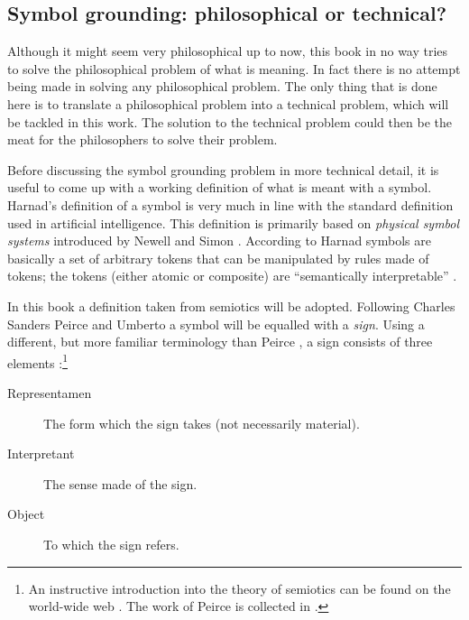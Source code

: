 \subsection{Symbol grounding: philosophical or technical?}

\label{s:intro:semiotic}

Although it might seem very philosophical up to now, this book in no way tries to solve the philosophical problem of what is meaning. In fact there is no attempt being made in solving any philosophical problem. The only thing that is done here is to translate a philosophical problem into a technical problem, which will be tackled in this work. The solution to the technical problem could then be the meat for the philosophers to solve their problem.


Before discussing the symbol grounding problem in more technical detail, it is useful to come up with a working definition of what is meant with a symbol. Harnad's definition of a symbol is very much in line with the standard definition used in artificial intelligence. This definition is primarily based on {\em physical symbol systems} introduced by Newell and Simon \citep{newell:1980,newell:1990}. According to Harnad symbols are basically a set of arbitrary tokens that can be manipulated by rules made of tokens; the tokens (either atomic or composite) are ``semantically interpretable'' \citep{harnad:1990}.


In this book a definition taken from semiotics will be adopted. Following Charles Sanders Peirce and Umberto \citep{eco:1976,eco:1986} a symbol will be equalled with a {\em sign}. Using a different, but more familiar terminology than Peirce  \citep{noth:1990}, a sign consists of three elements \citep{chandler:1994}:\footnote{An instructive introduction into the theory of semiotics can be found on the world-wide web \citep{chandler:1994}. The work of Peirce is collected in \citealt{peirce:1931}.}

\begin{description}
\item[Representamen] The form which the sign takes (not necessarily material).
\item[Interpretant] The sense made of the sign.
\item[Object] To which the sign refers. 
\end{description}

